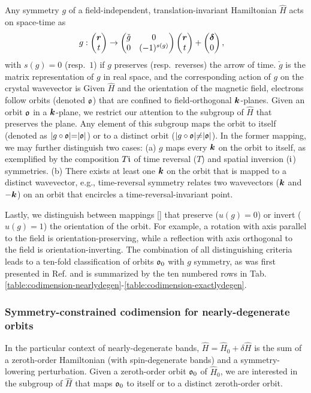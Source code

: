 \documentclass[aps, showpacs, twocolumn, notitlepage, superscriptaddress]{revtex4-1}
\begin{document}
Any symmetry $g$ of a field-independent, translation-invariant Hamiltonian $\hat{H}$ acts on space-time as
\begin{align}
&g: \begin{pmatrix} {\boldsymbol{r}}\\{t} \end{pmatrix} \rightarrow \begin{pmatrix} \check{g} & 0 \\ 0 &  (-1)^{s(g)} \end{pmatrix}\begin{pmatrix} {\boldsymbol{r}}\\{t} \end{pmatrix}+\begin{pmatrix} {\boldsymbol{\delta}}\\{0} \end{pmatrix}, \label{definesg}
\end{align}
with $s(g){=}0$ (resp.\ $1$) if $g$ preserves (resp.\  reverses) the arrow of time. $\check{g}$ is the matrix representation of $g$ in real space, and the corresponding action of  $g$ on the crystal wavevector is  
Given $\hat{H}$ and the orientation of the magnetic field, electrons follow orbits (denoted $\mathfrak{o}$) that are confined to field-orthogonal $\boldsymbol{k}$-planes.  Given an orbit $\mathfrak{o}$ in a $\boldsymbol{k}$-plane, we restrict our attention to the subgroup of $\hat{H}$ that preserves the plane. Any element of this subgroup maps the orbit to itself (denoted as $|g\circ\mathfrak{o}|{=}|\mathfrak{o}|$) or to a distinct orbit ($|g\circ\mathfrak{o}|{\ne}|\mathfrak{o}|$). In the former mapping, we may further distinguish two cases: (a)  $g$ maps every $\boldsymbol{k}$ on the orbit to itself, as exemplified by the composition $T\mathfrak{i}$ of time reversal ($T$) and spatial inversion ($\mathfrak{i}$)  symmetries. (b) There exists at least one $\boldsymbol{k}$ on the orbit that is mapped to a distinct wavevector, e.g., time-reversal symmetry relates two wavevectors ($\boldsymbol{k}$ and ${-}\boldsymbol{k}$) on an orbit that encircles a time-reversal-invariant point. 

Lastly, we distinguish  between mappings [] that preserve  ($u(g){=}0$) or invert ($u(g){=}1$) the orientation of the orbit. For example, a rotation with axis parallel to the field is orientation-preserving, while a reflection with axis orthogonal to the field is orientation-inverting. The combination of all distinguishing criteria leads to   a ten-fold classification of orbits $\mathfrak{o}_0$ with $g$ symmetry, as was first presented in Ref.  and is summarized by the ten numbered rows in Tab. \ref{table:codimension-nearlydegen}-\ref{table:codimension-exactlydegen}.

\subsubsection{Symmetry-constrained codimension for nearly-degenerate orbits}\label{sec:codimquasideg}

In the particular context of nearly-degenerate bands, $\hat{H}{=}\hat{H}_0{+}\delta \hat{H}$ is the sum of a zeroth-order Hamiltonian (with spin-degenerate bands) and a symmetry-lowering perturbation.  Given a zeroth-order orbit $\mathfrak{o}_0$ of $\hat{H}_0$, we  are interested in the subgroup of $\hat{H}$ that  maps $\mathfrak{o}_0$ to itself or to a distinct zeroth-order orbit. 
\end{document}
